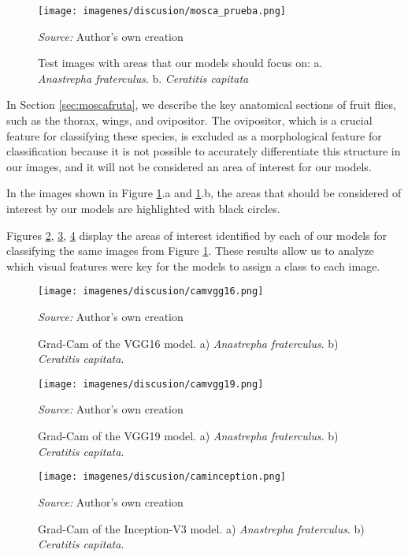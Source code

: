 \begin{figure}[htbp]
    \centering
    \texttt{[image: imagenes/discusion/mosca\_prueba.png]}
    \caption{Test images with areas that our models should focus on: a. \textit{Anastrepha fraterculus}. b. \textit{Ceratitis capitata}}
    \scriptsize \textit{Source:} Author's own creation
    \label{fig:moscaprueba}
\end{figure}

In Section \ref{sec:moscafruta}, we describe the key anatomical sections of fruit flies, such as the thorax, wings, and ovipositor. The ovipositor, which is a crucial feature for classifying these species, is excluded as a morphological feature for classification because it is not possible to accurately differentiate this structure in our images, and it will not be considered an area of interest for our models.

In the images shown in Figure \ref{fig:moscaprueba}.a and \ref{fig:moscaprueba}.b, the areas that should be considered of interest by our models are highlighted with black circles.

Figures \ref{fig:camvgg16}, \ref{fig:camvgg19}, \ref{fig:caminception} display the areas of interest identified by each of our models for classifying the same images from Figure \ref{fig:moscaprueba}. These results allow us to analyze which visual features were key for the models to assign a class to each image.

\begin{figure}[htbp]
    \centering
    \texttt{[image: imagenes/discusion/camvgg16.png]}
    \caption{Grad-Cam of the VGG16 model. a) \textit{Anastrepha fraterculus}. b) \textit{Ceratitis capitata}.}
    \scriptsize \textit{Source:} Author's own creation
    \label{fig:camvgg16}
\end{figure}

\begin{figure}[htbp]
    \centering
    \texttt{[image: imagenes/discusion/camvgg19.png]}
    \caption{Grad-Cam of the VGG19 model. a) \textit{Anastrepha fraterculus}. b) \textit{Ceratitis capitata}.}
    \scriptsize \textit{Source:} Author's own creation
    \label{fig:camvgg19}
\end{figure}

\begin{figure}[htbp]
    \centering
    \texttt{[image: imagenes/discusion/caminception.png]}
    \caption{Grad-Cam of the Inception-V3 model. a) \textit{Anastrepha fraterculus}. b) \textit{Ceratitis capitata}.}
    \scriptsize \textit{Source:} Author's own creation
    \label{fig:caminception}
\end{figure}

